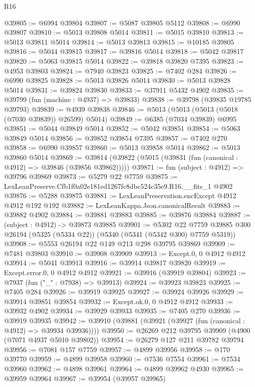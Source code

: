 \begin{lexlean}{R16}
\begin{coremodule}
@39805 := @6994 @39804
@39807 := @5087 @39805 @5112
@39808 := @6990 @39807
@39810 := @5013 @39808 @5014
@39811 := @5015 @39810
@39813 := @5013 @39811 @5014
@39814 := @5013 @39813
@39815 := @10185 @39805
@39816 := @5044 @39815
@39817 := @39816 @5014
@39818 := @5042 @39817
@39820 := @5063 @39815 @5014
@39822 := @39818 @39820 @7395
@39823 := @4953 @39803
@39824 := @7940 @39823
@39825 := @7402 @284
@39826 := @6990 @39825
@39828 := @5013 @39826 @5014
@39830 := @5013 @39828 @5014
@39831 := @39824 @39830
@39833 := @37911 @5432 @4902
@39835 := @39799 (fun (machine : @4937) => @39833)
@39838 := @39798 (@39835 @19785 @39793)
@39839 := @4939 @39838
@39846 := @5013 (@5013 (@5013 (@5018 (@7030 @39839)) @26599) @5014)
@39849 := @6385 (@7034 @39839) @6995
@39851 := @5044 @39849 @5014
@39852 := @5042 @39851
@39854 := @5063 @39849 @5014
@39856 := @39852 @39854 @7395
@39857 := @7402 @270
@39858 := @6990 @39857
@39860 := @5013 @39858 @5014
@39862 := @5013 @39860 @5014
@39869 := @39814 (@39822 (@5015 (@39831 (fun (canonical : @4912) => @39846 (@39856 @39862)))))
@39871 := fun (subject : @4912) => @39796 @39869
@39873 := @5279 @22 @7759
@39875 := LexLeanPreserve.Cfb1f0a02e181ed1267fc8dbc524c35e9.R16.__fits_1 @4902
@39876 := @5288 @39875
@39881 := LexLeanPreservation.encExcept @4912 @4912 @192 @192
@39882 := LexLeanKappa.Json.canonicalResult
@39883 := @39882 @4902
@39884 := @39881 @39883
@39885 := @39876 @39884
@39887 := (subject : @4912) -> @39873 @39885
@39901 := @5302
    @22
    @7759
    @39885
    @300
    @26194
    (@5325 (@5334 @22))
    (@5340 (@5341 (@5342 @300) @7759 @5319))
@39908 := @5553 @26194 @22 @149 @213 @298 @39795 @39869
@39909 := @7481 @39803
@39910 := @39908 @39909
@39913 := Except.{0, 0} @4912 @4912
@39914 := @5041 @39913
@39916 := @39914 @39817 @39820
@39919 := Except.error.{0, 0} @4912 @4912
@39921 := @39916 (@39919 @39804)
@39923 := @7937 (fun ("_" : @7938) => @39913)
@39924 := @39923 @39823
@39925 := @7405 @284
@39926 := @39919 @39925
@39927 := @39924 @39926
@39929 := @39914 @39851 @39854
@39932 := Except.ok.{0, 0} @4912 @4912
@39933 := @39932 @4902
@39934 := @39929 @39933
@39935 := @7405 @270
@39936 := @39919 @39935
@39942 := @39910 (@39881 (@39921 (@39927 (fun (canonical : @4912) => @39934 @39936))))
@39950 := @26269 @212 @39795 @39909 (@4900 (@7071 @4937 @5010 @39802))
@39954 := @26279 @127 @211 @39782 @39794
@39956 := @7081 @157 @7759
@39957 := @4899 @39956
@39958 := @170 @39770
@39959 := @4899 @39958
@39960 := @7536 @7554
@39961 := @7534 @39960
@39962 := @4898 @39961
@39964 := @4899 @39962 @4930
@39965 := @39959 @39964
@39967 := @39954 (@39957 @39965)

\end{coremodule}
\end{lexlean}
